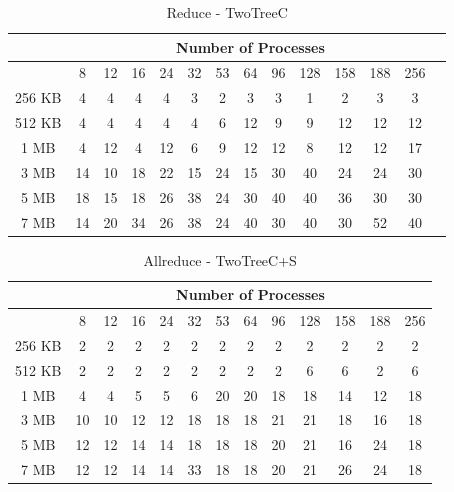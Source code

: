 \documentclass[sigplan,review,anonymous]{acmart}\settopmatter{printfolios=true,printccs=false,printacmref=false}
\begin{document}
\begin{table}[]
\caption{Reduce - TwoTreeC}
\begin{center}
\tablefont
\begin{tabular}{|c|c|c|c|c|c|c|c|c|c|c|c|c|c|}
\hline
& \multicolumn{12}{c|}{Number of Processes} \\
\hline
& 8 & 12 & 16 & 24 & 32 & 53 & 64 & 96 & 128 & 158 & 188 & 256\\
\hline
 256 KB & 4 & 4 & 4 & 4 & 3 & 2 & 3 & 3 & 1 & 2 & 3 & 3\\
 512 KB & 4 & 4 & 4 & 4 & 4 & 6 & 12 & 9 & 9 & 12 & 12 & 12\\
 1 MB & 4 & 12 & 4 & 12 & 6 & 9 & 12 & 12 & 8 & 12 & 12 & 17\\
 3 MB & 14 & 10 & 18 & 22 & 15 & 24 & 15 & 30 & 40 & 24 & 24 & 30\\
 5 MB & 18 & 15 & 18 & 26 & 38 & 24 & 30 & 40 & 40 & 36 & 30 & 30\\
 7 MB & 14 & 20 & 34 & 26 & 38 & 24 & 40 & 30 & 40 & 30 & 52 & 40\\
\hline
\end{tabular}
\end{center}
\end{table}

\begin{table}[]
\caption{Allreduce - TwoTreeC+S}
\begin{center}
\tablefont
\begin{tabular}{|c|c|c|c|c|c|c|c|c|c|c|c|c|}
\hline
 & \multicolumn{12}{c|}{Number of Processes} \\
\hline
 & 8 & 12 & 16 & 24 & 32 & 53 & 64 & 96 & 128 & 158 & 188 & 256\\
\hline
 256 KB & 2 & 2 & 2 & 2 & 2 & 2 & 2 & 2 & 2 & 2 & 2 & 2\\
 512 KB & 2 & 2 & 2 & 2 & 2 & 2 & 2 & 2 & 6 & 6 & 2 & 6\\
 1 MB & 4 & 4 & 5 & 5 & 6 & 20 & 20 & 18 & 18 & 14 & 12 & 18\\
 3 MB & 10 & 10 & 12 & 12 & 18 & 18 & 18 & 21 & 21 & 18 & 16 & 18\\
 5 MB & 12 & 12 & 14 & 14 & 18 & 18 & 18 & 20 & 21 & 16 & 24 & 18\\
 7 MB & 12 & 12 & 14 & 14 & 33 & 18 & 18 & 20 & 21 & 26 & 24 & 18\\
\hline
\end{tabular}
\end{center}
\end{table}

\end{document}
